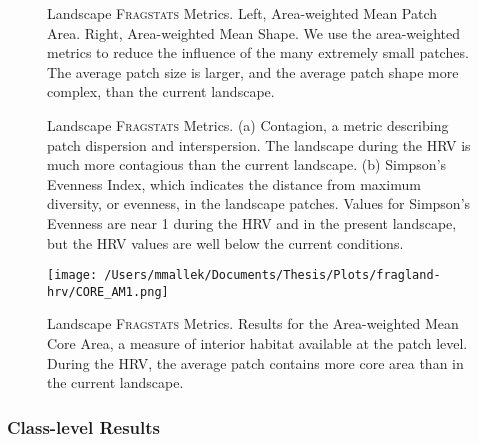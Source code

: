 \clearpage
\begin{figure}[!htbp]
  \centering
\caption{Landscape \textsc{Fragstats} Metrics. Left, Area-weighted Mean Patch Area. Right, Area-weighted Mean Shape. We use the area-weighted metrics to reduce the influence of the many extremely small patches. The average patch size is larger, and the average patch shape more complex, than the current landscape.} 
\label{fig:fragland_areashape}
\end{figure}

\begin{figure}[!htbp]
  \centering
\caption{Landscape \textsc{Fragstats} Metrics. (a) Contagion, a metric describing patch dispersion and interspersion. The landscape during the HRV is much more contagious than the current landscape. (b) Simpson's Evenness Index, which indicates the distance from maximum diversity, or evenness, in the landscape patches. Values for Simpson's Evenness are near 1 during the HRV and in the present landscape, but the HRV values are well below the current conditions.} 
\label{fig:fragland_contagsiei}
\end{figure}

\begin{figure}[!htbp]
  \centering
  \texttt{[image: /Users/mmallek/Documents/Thesis/Plots/fragland-hrv/CORE\_AM1.png]}
\caption{Landscape \textsc{Fragstats} Metrics. Results for the Area-weighted Mean Core Area, a measure of interior habitat available at the patch level. During the HRV, the average patch contains more core area than in the current landscape.} 
\label{fig:fragland_core}
\end{figure}

\clearpage


\subsubsection{Class-level Results}

